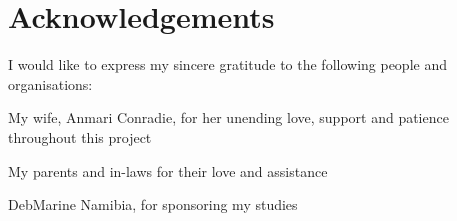 \begin{abstract}[english]%

\end{abstract}





\chapter{Acknowledgements}%

I would like to express my sincere gratitude to the following people and organisations:

My wife, Anmari Conradie, for her unending love, support and patience throughout this project

My parents and in-laws for their love and assistance

DebMarine Namibia, for sponsoring my studies




\endinput
